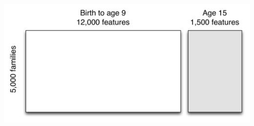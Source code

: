 \documentclass[aspectratio=169]{beamer}
\begin{document}
\begin{frame}

\begin{center}
\end{center}

\end{frame}
\begin{frame}

\begin{center}
\includegraphics[width=\textwidth]{figures/ff_design_matrix_ml}
\end{center}

\end{frame}
\end{document}
